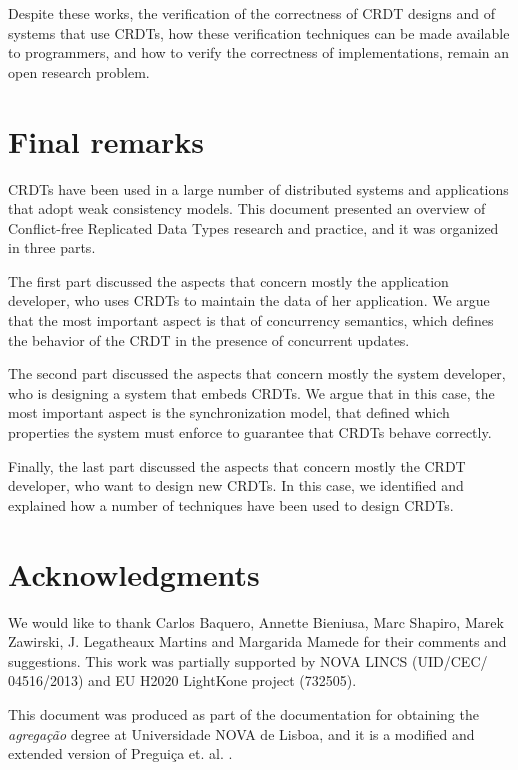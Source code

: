 \documentclass[12pt]{article}
\begin{document}
Despite these works, the verification of the correctness of CRDT designs and
of systems that use CRDTs, how these verification techniques can be made available
to programmers, and how to verify the correctness of implementations, remain 
an open research problem.

\section{Final remarks}

CRDTs have been used in a large number of distributed systems and applications
that adopt weak consistency models. 
This document presented an overview of Conflict-free Replicated Data Types research 
and practice, and it was organized in three parts.

The first part discussed the aspects that concern mostly the application developer, 
who uses CRDTs to maintain the data of her application. We argue that the most
important aspect is that of concurrency semantics, which defines the behavior of
the CRDT in the presence of concurrent updates.

The second part discussed the aspects that concern mostly the system developer, 
who is designing a system that embeds CRDTs. We argue that in this case, the
most important aspect is the synchronization model, that defined which properties
the system must enforce to guarantee that CRDTs behave correctly.

Finally, the last part discussed the aspects that concern mostly the CRDT developer,
who want to design new CRDTs. In this case, we identified and explained how a 
number of techniques have been used to design CRDTs. 


\section*{Acknowledgments}

We would like to thank Carlos Baquero, Annette Bieniusa, Marc Shapiro, Marek Zawirski, 
J. Legatheaux Martins and Margarida Mamede for their comments and suggestions.
This work was partially supported by NOVA LINCS (UID/CEC/ 04516/2013) and 
EU H2020 LightKone project (732505).

This document was produced as part of the documentation for obtaining the 
\emph{agregação} degree at Universidade NOVA de Lisboa, and it is a modified and extended 
version of Preguiça et. al. \cite{crdt:enc}.



\end{document}
